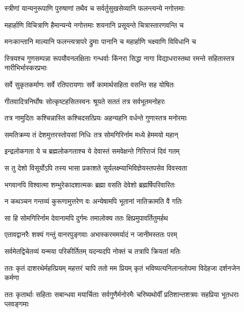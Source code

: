 \twolineshloka
{स्त्रीणां यान्यनुरूपाणि पुरुषाणां तथैव च}
{सर्वर्तुसुखसेव्यानि फलन्त्यन्ये नगोत्तमाः} %

\twolineshloka
{महार्हाणि विचित्राणि हैमान्यन्ये नगोत्तमाः}
{शयनानि प्रसूयन्ते चित्रास्तारणवन्ति च} %

\twolineshloka
{मनःकान्तानि माल्यानि फलन्त्यत्रापरे द्रुमाः}
{पानानि च महार्हाणि भक्ष्याणि विविधानि च} %

\threelineshloka
{स्त्रियश्च गुणसम्पन्ना रूपयौवनलक्षिताः}
{गन्धर्वाः किंनरा सिद्धा नागा विद्याधरास्तथा}
{रमन्ते सहितास्तत्र नारीभिर्भास्करप्रभाः} %

\twolineshloka
{सर्वे सुकृतकर्माणः सर्वे रतिपरायणाः}
{सर्वे कामार्थसहिता वसन्ति सह योषितः} %

\twolineshloka
{गीतवादित्रनिर्घोषः सोत्कृष्टहसितस्वनः}
{श्रूयते सततं तत्र सर्वभूतमनोहरः} %

\twolineshloka
{तत्र नामुदितः कश्चिन्नास्ति कश्चिदसत्प्रियः}
{अहन्यहनि वर्धन्ते गुणास्तत्र मनोरमाः} %

\twolineshloka
{समतिक्रम्य तं देशमुत्तरस्तोयसां निधिः}
{तत्र सोमगिरिर्नाम मध्ये हेममयो महान्} %

\twolineshloka
{इन्द्रलोकगता ये च ब्रह्मलोकगताश्च ये}
{देवास्तं समवेक्षन्ते गिरिराजं दिवं गतम्} %

\twolineshloka
{स तु देशो विसूर्योऽपि तस्य भासा प्रकाशते}
{सूर्यलक्ष्म्याभिविज्ञेयस्तपसेव विवस्वता} %

\twolineshloka
{भगवानपि विश्वात्मा शम्भुरेकादशात्मकः}
{ब्रह्मा वसति देवेशो ब्रह्मर्षिपरिवारितः} %

\twolineshloka
{न कथञ्चन गन्तव्यं कुरूणामुत्तरेण वः}
{अन्येषामपि भूतानां नातिक्रामति वै गतिः} %

\twolineshloka
{सा हि सोमगिरिर्नाम देवानामपि दुर्गमः}
{तमालोक्य ततः क्षिप्रमुपावर्तितुमर्हथ} %

\twolineshloka
{एतावद्वानरैः शक्यं गन्तुं वानरपुङ्गवाः}
{अभास्करममर्यादं न जानीमस्ततः परम्} %

\twolineshloka
{सर्वमेतद्विचेतव्यं यन्मया परिकीर्तितम्}
{यदन्यदपि नोक्तं च तत्रापि क्रियतां मतिः} %

\fourlineindentedshloka
{ततः कृतं दाशरथेर्महत्प्रियम्}
{महत्तरं चापि ततो मम प्रियम्}
{कृतं भविष्यत्यनिलानलोपमा}
{विदेहजा दर्शनजेन कर्मणा} %

\fourlineindentedshloka
{ततः कृतार्थाः सहिताः सबान्धवा}
{मयार्चिताः सर्वगुणैर्मनोरमैः}
{चरिष्यथोर्वीं प्रतिशान्तशत्रवः}
{सहप्रिया भूतधराः प्लवङ्गमाः} %


